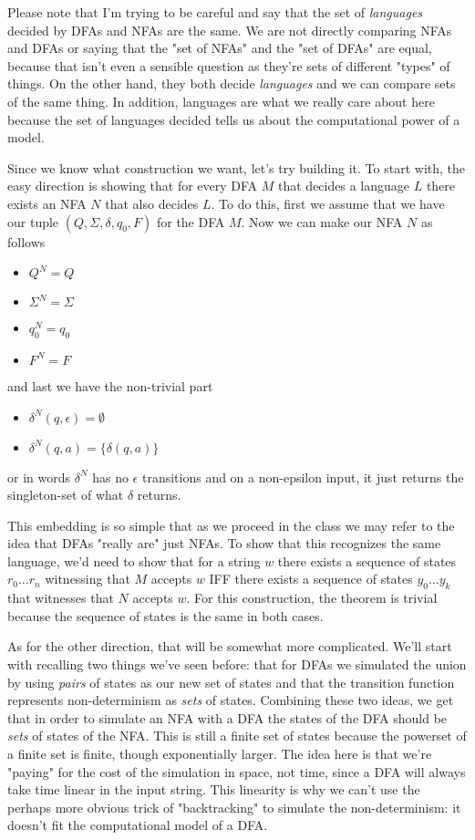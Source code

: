 \documentclass[11pt]{article}
\begin{document}
Please note that I'm trying to be careful and say that the set of \emph{languages} decided by DFAs and NFAs are the same. We are not directly comparing NFAs and DFAs or saying that the "set of NFAs" and the "set of DFAs" are equal, because that isn't even a sensible question as they're sets of different "types" of things. On the other hand, they both decide \emph{languages} and we can compare sets of the same thing. In addition, languages are what we really care about here because the set of languages decided tells us about the computational power of a model.

Since we know what construction we want, let's try building it. To start with, the easy direction is showing that for every DFA $M$ that decides a language $L$ there exists an NFA $N$ that also decides $L$. To do this, first we assume that we have our tuple $(Q,\Sigma,\delta,q_0,F)$ for the DFA $M$. Now we can make our NFA $N$ as follows

\begin{itemize}
\item $Q^N = Q$
\item $\Sigma^N = \Sigma$
\item $q^N_0 = q_0$
\item $F^N = F$
\end{itemize}
and last we have the non-trivial part
\begin{itemize}
\item $\delta^N(q,\epsilon) = \emptyset$
\item $\delta^N(q,a) = \{\delta(q,a)\}$
\end{itemize}
or in words $\delta^N$ has no $\epsilon$ transitions and on a non-epsilon input, it just returns the singleton-set of what $\delta$ returns.

This embedding is so simple that as we proceed in the class we may refer to the idea that DFAs "really are" just NFAs. To show that this recognizes the same language, we'd need to show that for a string $w$ there exists a sequence of states $r_0 \ldots r_n$ witnessing that $M$ accepts $w$ IFF there exists a sequence of states $y_0 \ldots y_k$ that witnesses that $N$ accepts $w$. For this construction, the theorem is trivial because the sequence of states is the same in both cases. 

As for the other direction, that will be somewhat more complicated. We'll start with recalling two things we've seen before: that for DFAs we simulated the union by using \emph{pairs} of states as our new set of states and that the transition function represents non-determinism as \emph{sets} of states. Combining these two ideas, we get that in order to simulate an NFA with a DFA the states of the DFA should be \emph{sets} of states of the NFA. This is still a finite set of states because the powerset of a finite set is finite, though exponentially larger. The idea here is that we're "paying" for the cost of the simulation in space, not time, since a DFA will always take time linear in the input string. This linearity is why we can't use the perhaps more obvious trick of "backtracking" to simulate the non-determinism: it doesn't fit the computational model of a DFA.
\end{document}
